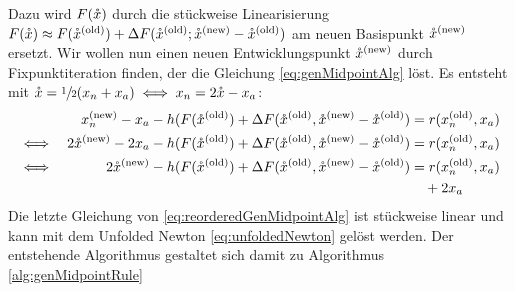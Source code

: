 Dazu wird $F(\mathring{x})$ durch die stückweise Linearisierung $F(\mathring{x})\approx F(\mathring{x}^{\text{(old)}})+\Delta F(\mathring{x}^{\text{(old)}};\mathring{x}^{\text{(new)}} -\mathring{x}^{\text{(old)}} )$ am neuen Basispunkt $\mathring{x}^{\text{(new)}}$ ersetzt. 
Wir wollen nun einen neuen Entwicklungspunkt $\mathring{x}^{\text{(new)}}$ durch Fixpunktiteration finden, der die Gleichung \eqref{eq:genMidpointAlg} löst. 
Es entsteht mit $\mathring{x} = \sfrac{1}{2} (x_n + x_a) \iff x_n = 2\mathring{x} - x_a$:
\begin{equation}
\label{eq:reorderedGenMidpointAlg}
 \begin{aligned}
		 && x_n^{\text{(new)}} - x_a - h (F(\mathring{x}^{\text{(old)}}) +\Delta F(\mathring{x}^{\text{(old)}},\mathring{x}^{\text{(new)}} - \mathring{x}^{\text{(old)}}) &= r(x_n^{\text{(old)}},x_a)\\
 \iff && 2\mathring{x}^{\text{(new)}} - 2x_a - h (F(\mathring{x}^{\text{(old)}}) +\Delta F(\mathring{x}^{\text{(old)}},\mathring{x}^{\text{(new)}} - \mathring{x}^{\text{(old)}}) &= r(x_n^{\text{(old)}},x_a)\\
 \iff && 2\mathring{x}^{\text{(new)}} -  h (F(\mathring{x}^{\text{(old)}}) +\Delta F(\mathring{x}^{\text{(old)}},\mathring{x}^{\text{(new)}} - \mathring{x}^{\text{(old)}}) &= r(x_n^{\text{(old)}},x_a)\\&&&\quad + 2x_a
 \end{aligned}
\end{equation}
Die letzte Gleichung von \eqref{eq:reorderedGenMidpointAlg} ist stückweise linear und kann mit dem Unfolded Newton \eqref{eq:unfoldedNewton} gelöst werden. Der entstehende Algorithmus gestaltet sich damit zu Algorithmus \ref{alg:genMidpointRule}


